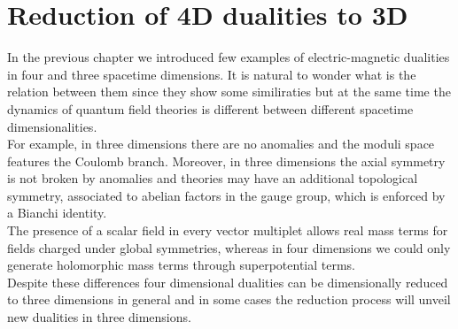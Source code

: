 
\chapter{\bfseries Reduction of 4D dualities to 3D}

% 


In the previous chapter we introduced few examples of electric-magnetic dualities in four and three spacetime dimensions.
It is natural to wonder what is the relation between them since they show some similiraties but at the same time the dynamics of quantum field theories is different between different spacetime dimensionalities.\\
For example, in three dimensions there are no anomalies and the moduli space features the Coulomb branch. 
Moreover, in three dimensions the axial symmetry is not broken by anomalies and theories may have an additional topological symmetry, associated to abelian factors in the gauge group,  which is enforced by a Bianchi identity.\\
The presence of a scalar field in every vector multiplet allows real mass terms for fields charged under global symmetries, whereas in four dimensions we could only generate holomorphic mass terms through superpotential terms.\\
Despite these differences four dimensional dualities can be dimensionally reduced to three dimensions in general and in some cases the reduction process will unveil new dualities in three dimensions.
\\

